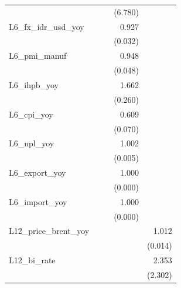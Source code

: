 {\begin{tabular}{l*{4}{D{.}{.}{-1}}}
                &                  &                  &  (6.780)         &                  \\
\addlinespace
L6\_fx\_idr\_usd\_yoy&                  &                  &    0.927\sym{**} &                  \\
                &                  &                  &  (0.032)         &                  \\
\addlinespace
L6\_pmi\_manuf    &                  &                  &    0.948         &                  \\
                &                  &                  &  (0.048)         &                  \\
\addlinespace
L6\_ihpb\_yoy     &                  &                  &    1.662\sym{***}&                  \\
                &                  &                  &  (0.260)         &                  \\
\addlinespace
L6\_cpi\_yoy      &                  &                  &    0.609\sym{***}&                  \\
                &                  &                  &  (0.070)         &                  \\
\addlinespace
L6\_npl\_yoy      &                  &                  &    1.002         &                  \\
                &                  &                  &  (0.005)         &                  \\
\addlinespace
L6\_export\_yoy   &                  &                  &    1.000         &                  \\
                &                  &                  &  (0.000)         &                  \\
\addlinespace
L6\_import\_yoy   &                  &                  &    1.000         &                  \\
                &                  &                  &  (0.000)         &                  \\
\addlinespace
L12\_price\_brent\_yoy&                  &                  &                  &    1.012         \\
                &                  &                  &                  &  (0.014)         \\
\addlinespace
L12\_bi\_rate     &                  &                  &                  &    2.353         \\
                &                  &                  &                  &  (2.302)         \\

\end{tabular}}
